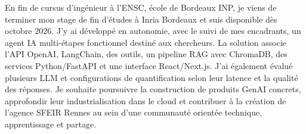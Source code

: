 
\begin{cvparagraph}
En fin de cursus d’ingénieur à l’ENSC, école de Bordeaux INP, je viens de terminer mon stage de fin d’études à Inria Bordeaux et suis disponible dès octobre 2026. J’y ai développé en autonomie, avec le suivi de mes encadrants, un agent IA multi-étapes fonctionnel destiné aux chercheurs. La solution associe l’API OpenAI, LangChain, des outils, un pipeline RAG avec ChromaDB, des services Python/FastAPI et une interface React/Next.js. J’ai également évalué plusieurs LLM et configurations de quantification selon leur latence et la qualité des réponses. Je souhaite poursuivre la construction de produits GenAI concrets, approfondir leur industrialisation dans le cloud et contribuer à la création de l’agence SFEIR Rennes au sein d’une communauté orientée technique, apprentissage et partage.
\end{cvparagraph}
